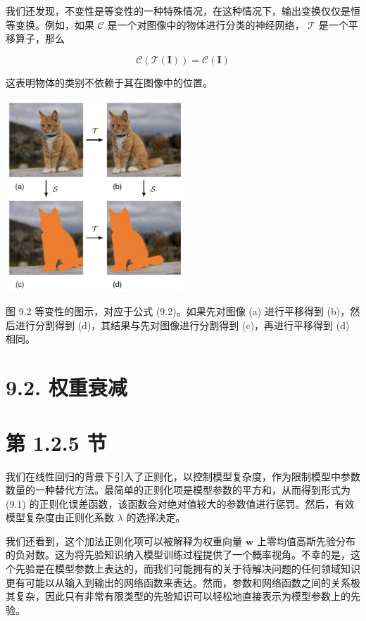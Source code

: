 \documentclass[10pt]{report}
\begin{document}
我们还发现，不变性是等变性的一种特殊情况，在这种情况下，输出变换仅仅是恒等变换。例如，如果 \(\mathcal{C}\) 是一个对图像中的物体进行分类的神经网络， \(\mathcal{T}\) 是一个平移算子，那么

\[
\mathcal{C}\left( {\mathcal{T}\left( \mathbf{I}\right) }\right)  = \mathcal{C}\left( \mathbf{I}\right)  \tag{9.4}
\]

这表明物体的类别不依赖于其在图像中的位置。

\begin{center}
\includegraphics[max width=0.5\textwidth]{images/0194e279-9b28-703a-88f4-c3ac21e2010d_279_886_354_652_707_0.jpg}
\end{center}
\hspace*{3em} 

图 9.2 等变性的图示，对应于公式 (9.2)。如果先对图像 (a) 进行平移得到 (b)，然后进行分割得到 (d)，其结果与先对图像进行分割得到 (c)，再进行平移得到 (d) 相同。

\section*{9.2. 权重衰减}

\section*{第 1.2.5 节}

我们在线性回归的背景下引入了正则化，以控制模型复杂度，作为限制模型中参数数量的一种替代方法。最简单的正则化项是模型参数的平方和，从而得到形式为 (9.1) 的正则化误差函数，该函数会对绝对值较大的参数值进行惩罚。然后，有效模型复杂度由正则化系数 \(\lambda\) 的选择决定。

我们还看到，这个加法正则化项可以被解释为权重向量 \(\mathbf{w}\) 上零均值高斯先验分布的负对数。这为将先验知识纳入模型训练过程提供了一个概率视角。不幸的是，这个先验是在模型参数上表达的，而我们可能拥有的关于待解决问题的任何领域知识更有可能以从输入到输出的网络函数来表达。然而，参数和网络函数之间的关系极其复杂，因此只有非常有限类型的先验知识可以轻松地直接表示为模型参数上的先验。
\end{document}
